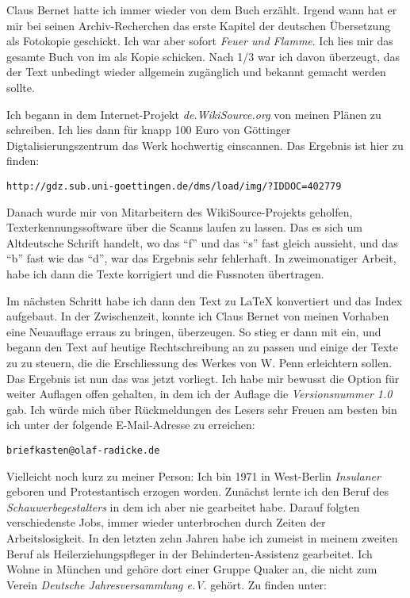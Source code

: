 \medskip

Claus Bernet hatte ich immer wieder von dem Buch erzählt. Irgend wann hat er mir
bei seinen Archiv-Recherchen das erste Kapitel der deutschen Übersetzung als
Fotokopie geschickt. Ich war aber sofort \textit{Feuer und
Flamme}. Ich lies mir das gesamte Buch von im als Kopie schicken. Nach 1/3 war
ich davon überzeugt, das der Text unbedingt wieder allgemein zugänglich und
bekannt gemacht werden sollte.

\medskip

Ich begann in dem Internet-Projekt \textit{de.WikiSource.org} von meinen Plänen
zu schreiben. Ich lies dann für knapp 100 Euro von Göttinger
Digtalisierungszentrum das Werk hochwertig einscannen. Das Ergebnis ist hier zu
finden:

\begin{center}
\texttt{http://gdz.sub.uni-goettingen.de/dms/load/img/?IDDOC=402779}
\end{center}

Danach wurde mir von Mitarbeitern des WikiSource-Projekts geholfen,
Texterkennungssoftware über die Scanns laufen zu lassen. Das es sich um
Altdeutsche Schrift handelt, wo das "`f"' und das "`s"' fast gleich aussieht,
und das "`b"' fast wie das "`d"', war das Ergebnis sehr fehlerhaft. In
zweimonatiger Arbeit, habe ich dann die Texte korrigiert und die Fussnoten
übertragen.

\medskip

Im nächsten Schritt habe ich dann den Text zu \LaTeX{} konvertiert und das Index
aufgebaut. In der Zwischenzeit, konnte ich Claus Bernet von meinen Vorhaben eine
Neuauflage erraus zu bringen, überzeugen. So stieg er dann mit ein, und begann
den Text auf heutige Rechtschreibung an zu passen und einige der Texte zu zu
steuern, die die Erschliessung des Werkes von W. Penn erleichtern sollen.
Das Ergebnis ist nun das was jetzt vorliegt. Ich habe mir bewusst die
Option für weiter Auflagen offen gehalten, in dem ich der Auflage die
\textit{Versionsnummer 1.0} gab. Ich würde mich über Rückmeldungen des Lesers
sehr Freuen am besten bin ich unter der folgende E-Mail-Adresse zu erreichen:

\begin{center}
\texttt{briefkasten@olaf-radicke.de}
\end{center}

Vielleicht noch kurz zu meiner Person: Ich bin 1971 in West-Berlin
\textit{Insulaner} geboren und Protestantisch erzogen worden. Zunächst lernte
ich den Beruf des \textit{Schauwerbegestalters} in dem ich aber nie gearbeitet
habe. Darauf folgten verschiedenste Jobs, immer wieder unterbrochen durch Zeiten
der Arbeitslosigkeit. In den letzten zehn Jahren habe ich zumeist in meinem
zweiten Beruf als Heilerziehungspfleger in der Behinderten-Assistenz gearbeitet.
Ich Wohne in München und gehöre dort einer Gruppe Quaker an, die nicht zum
Verein \textit{Deutsche Jahresversammlung e.V}. gehört. Zu finden unter:

